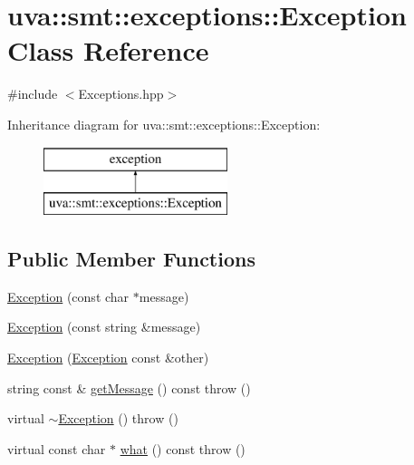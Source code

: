 \hypertarget{classuva_1_1smt_1_1exceptions_1_1_exception}{}\section{uva\+:\+:smt\+:\+:exceptions\+:\+:Exception Class Reference}
\label{classuva_1_1smt_1_1exceptions_1_1_exception}


{\ttfamily \#include $<$Exceptions.\+hpp$>$}

Inheritance diagram for uva\+:\+:smt\+:\+:exceptions\+:\+:Exception\+:\begin{figure}[H]
\begin{center}
\leavevmode
\includegraphics[height=2.000000cm]{classuva_1_1smt_1_1exceptions_1_1_exception}
\end{center}
\end{figure}
\subsection*{Public Member Functions}
\begin{DoxyCompactItemize}
\item 
\hyperlink{classuva_1_1smt_1_1exceptions_1_1_exception_a42e50b1d8a373992eb38adca8b5da8c0}{Exception} (const char $\ast$message)
\item 
\hyperlink{classuva_1_1smt_1_1exceptions_1_1_exception_a717a591b94ecbbc7f17e39b60fca3854}{Exception} (const string \&message)
\item 
\hyperlink{classuva_1_1smt_1_1exceptions_1_1_exception_a428f19e9377f8658e23f3a58251f18f4}{Exception} (\hyperlink{classuva_1_1smt_1_1exceptions_1_1_exception}{Exception} const \&other)
\item 
string const \& \hyperlink{classuva_1_1smt_1_1exceptions_1_1_exception_ad9041cffc8d5f7ca1c3f4bc9c857462c}{get\+Message} () const   throw ()
\item 
virtual \hyperlink{classuva_1_1smt_1_1exceptions_1_1_exception_a1ddbe2ffb25aca9ef031f6584af60e23}{$\sim$\+Exception} ()  throw ()
\item 
virtual const char $\ast$ \hyperlink{classuva_1_1smt_1_1exceptions_1_1_exception_a0ea6aae278f6b04d4d99a0b73befe5ee}{what} () const   throw ()
\end{DoxyCompactItemize}


